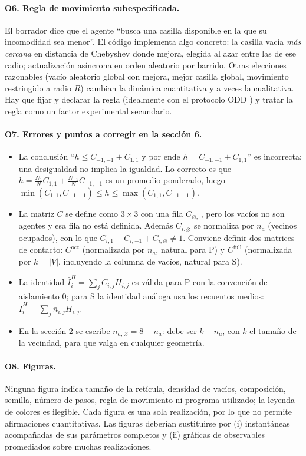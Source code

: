 \documentclass[11pt,a4paper]{article}
\theoremstyle{plain}
\theoremstyle{definition}
\theoremstyle{remark}
\newcommand{\vac}{\varnothing}
\newcommand{\modP}{\textsf{P}}
\newcommand{\modS}{\textsf{S}}
\begin{document}
\paragraph{O6. Regla de movimiento subespecificada.}
El borrador dice que el agente ``busca una casilla disponible en la que su
incomodidad sea menor''. El código implementa algo concreto: la casilla vacía
\emph{más cercana} en distancia de Chebyshev donde mejora, elegida al azar entre
las de ese radio; actualización asíncrona en orden aleatorio por barrido. Otras
elecciones razonables (vacío aleatorio global con mejora, mejor casilla global,
movimiento restringido a radio $R$) cambian la dinámica cuantitativa y a veces
la cualitativa. Hay que fijar y declarar la regla (idealmente con el protocolo
ODD \cite{Grimm2020}) y tratar la regla como un factor experimental secundario.

\paragraph{O7. Errores y puntos a corregir en la sección 6.}
\begin{itemize}
  \item La conclusión ``$h\le C_{-1,-1}+C_{1,1}$ y por ende
  $h=C_{-1,-1}+C_{1,1}$'' es incorrecta: una desigualdad no implica la igualdad.
  Lo correcto es que $h=\frac{N_1}{N}C_{1,1}+\frac{N_{-1}}{N}C_{-1,-1}$ es un
  promedio ponderado, luego
  $\min(C_{1,1},C_{-1,-1})\le h\le\max(C_{1,1},C_{-1,-1})$.
  \item La matriz $C$ se define como $3\times3$ con una fila $C_{\vac,\cdot}$,
  pero los vacíos no son agentes y esa fila no está definida. Además
  $C_{i,\vac}$ se normaliza por $n_a$ (vecinos ocupados), con lo que
  $C_{i,1}+C_{i,-1}+C_{i,\vac}\neq1$. Conviene definir dos matrices de
  contacto: $C^{\mathrm{occ}}$ (normalizada por $n_a$, natural para \modP) y
  $C^{\mathrm{full}}$ (normalizada por $k=|V|$, incluyendo la columna de
  vacíos, natural para \modS).
  \item La identidad $\bar I^H_i=\sum_j C_{i,j}H_{i,j}$ es válida para \modP{}
  con la convención de aislamiento $0$; para \modS{} la identidad análoga usa
  los recuentos medios: $\bar I^H_i=\sum_j \bar n_{i,j}H_{i,j}$.
  \item En la sección 2 se escribe $n_{a,\vac}=8-n_a$: debe ser $k-n_a$, con
  $k$ el tamaño de la vecindad, para que valga en cualquier geometría.
\end{itemize}

\paragraph{O8. Figuras.}
Ninguna figura indica tamaño de la retícula, densidad de vacíos, composición,
semilla, número de pasos, regla de movimiento ni programa utilizado; la leyenda
de colores es ilegible. Cada figura es una sola realización, por lo que no
permite afirmaciones cuantitativas. Las figuras deberían sustituirse por
(i) instantáneas acompañadas de sus parámetros completos y (ii) gráficas de
observables promediados sobre muchas realizaciones.
\end{document}
